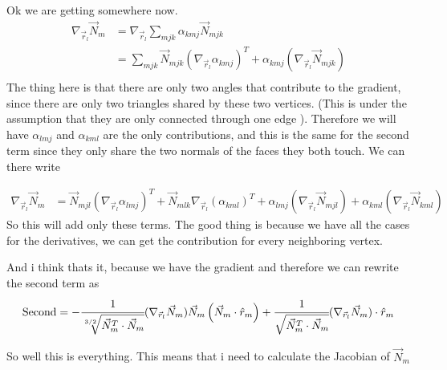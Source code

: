 \documentclass[11pt]{article}
\theoremstyle{plain}
\theoremstyle{definition}
\begin{document}
Ok we are getting somewhere now.
\begin{align}
  \nabla_{\vec{r}_l}\vec{N}_m&=\nabla_{\vec{r}_l}\sum_{mjk}\alpha_{kmj}\vec{N}_{mjk}\\
  &=\sum_{mjk}\vec{N}_{mjk}(\nabla_{\vec{r}_l}\alpha_{kmj})^T+\alpha_{kmj}(\nabla_{\vec{r}_l}\vec{N}_{mjk} )\\
\end{align}
The thing here is that there are only two angles that contribute to the gradient, since there are only two triangles shared by these two vertices. (This is under the assumption that they are only connected through one edge ).
Therefore we will have $\alpha_{lmj}$ and $\alpha_{kml}$ are the only contributions, and this is the same for the second  term since they only share the two normals of the faces they both touch.
We can there write 

\begin{align}
  \nabla_{\vec{r}_l}\vec{N}_m&=\vec{N}_{mjl}(\nabla_{\vec{r}_l}\alpha_{lmj})^T+\vec{N}_{mlk}\nabla_{\vec{r}_l}(\alpha_{kml})^T+\alpha_{lmj}(\nabla_{\vec{r}_l} \vec{N}_{mjl})+\alpha_{kml}(\nabla_{\vec{r}_l}\vec{N}_{kml})
\end{align}
So this will add only these terms. The good thing is because we have all the cases for the derivatives, we can get the contribution for every neighboring vertex. 

And i think thats it, because we have the gradient and therefore we can rewrite the second term as 
\begin{equation}
  \text{Second}=-\cfrac{1}{\sqrt[3/2]{\vec{N}_m^T\cdot \vec{N}_m}}(\nabla_{\vec{r}_l}\vec{N}_m)\vec{N}_m \left(\vec{N}_m\cdot \hat{r}_m  \right)+\cfrac{1}{\sqrt{\vec{N}_m^T\cdot\vec{N}_m}}(\nabla_{\vec{r}_l}\vec{N}_m )\cdot \hat{r}_m
\end{equation}

So well this is everything. This means that i need to calculate the Jacobian of $\vec{N}_m$
\end{document}

